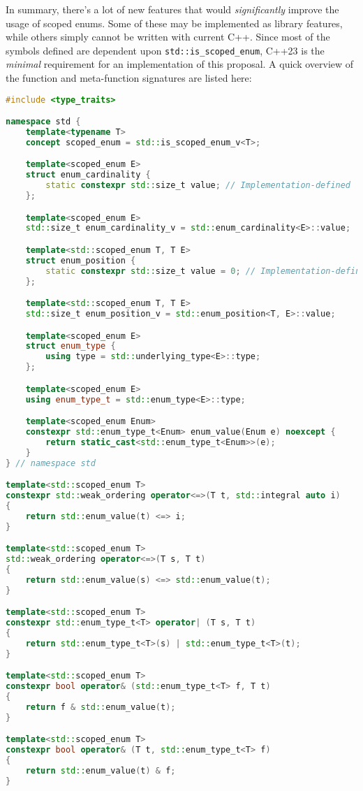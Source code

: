 \documentclass[
  format=manuscript,
  screen=true,
  review=false,
  nonacm=true,
  timestamp=true,
  balance=false]{acmart}
\begin{document}
In summary, there's a lot of new features that would \textit{significantly} improve
the usage of scoped enums. Some of these may be implemented as library features,
while others simply cannot be written with current C++. Since most of the symbols
defined are dependent upon \texttt{std::is\_scoped\_enum}, C++23 is the
\textit{minimal} requirement for an implementation of this proposal. A quick overview
of the function and meta-function signatures are listed here:\vspace{2mm}

\begin{lstlisting}[language=Cpp]
#include <type_traits>

namespace std {
    template<typename T>
    concept scoped_enum = std::is_scoped_enum_v<T>;

    template<scoped_enum E>
    struct enum_cardinality {
        static constexpr std::size_t value; // Implementation-defined
    };

    template<scoped_enum E>
    std::size_t enum_cardinality_v = std::enum_cardinality<E>::value;

    template<std::scoped_enum T, T E>
    struct enum_position {
        static constexpr std::size_t value = 0; // Implementation-defined
    };

    template<std::scoped_enum T, T E>
    std::size_t enum_position_v = std::enum_position<T, E>::value;

    template<scoped_enum E>
    struct enum_type {
        using type = std::underlying_type<E>::type;
    };

    template<scoped_enum E>
    using enum_type_t = std::enum_type<E>::type;

    template<scoped_enum Enum>
    constexpr std::enum_type_t<Enum> enum_value(Enum e) noexcept {
        return static_cast<std::enum_type_t<Enum>>(e);
    }
} // namespace std

template<std::scoped_enum T>
constexpr std::weak_ordering operator<=>(T t, std::integral auto i)
{
    return std::enum_value(t) <=> i;
}

template<std::scoped_enum T>
std::weak_ordering operator<=>(T s, T t)
{
    return std::enum_value(s) <=> std::enum_value(t);
}

template<std::scoped_enum T>
constexpr std::enum_type_t<T> operator| (T s, T t)
{
    return std::enum_type_t<T>(s) | std::enum_type_t<T>(t);
}

template<std::scoped_enum T>
constexpr bool operator& (std::enum_type_t<T> f, T t)
{
    return f & std::enum_value(t);
}

template<std::scoped_enum T>
constexpr bool operator& (T t, std::enum_type_t<T> f)
{
    return std::enum_value(t) & f;
}
\end{lstlisting}
\end{document}
